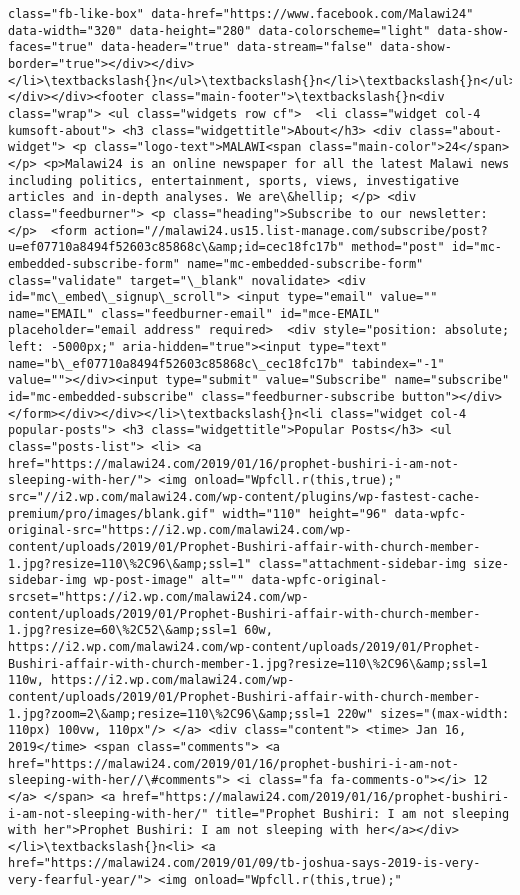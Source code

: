 \documentclass[11pt]{article}
\begin{document}
\begin{Verbatim}[commandchars=\\\{\}]
class="fb-like-box" data-href="https://www.facebook.com/Malawi24" data-width="320" data-height="280" data-colorscheme="light" data-show-faces="true" data-header="true" data-stream="false" data-show-border="true"></div></div></li>\textbackslash{}n</ul>\textbackslash{}n</li>\textbackslash{}n</ul>\textbackslash{}n</aside></div></div><footer class="main-footer">\textbackslash{}n<div class="wrap"> <ul class="widgets row cf">  <li class="widget col-4 kumsoft-about"> <h3 class="widgettitle">About</h3> <div class="about-widget"> <p class="logo-text">MALAWI<span class="main-color">24</span></p> <p>Malawi24 is an online newspaper for all the latest Malawi news including politics, entertainment, sports, views, investigative articles and in-depth analyses. We are\&hellip; </p> <div class="feedburner"> <p class="heading">Subscribe to our newsletter:</p>  <form action="//malawi24.us15.list-manage.com/subscribe/post?u=ef07710a8494f52603c85868c\&amp;id=cec18fc17b" method="post" id="mc-embedded-subscribe-form" name="mc-embedded-subscribe-form" class="validate" target="\_blank" novalidate> <div id="mc\_embed\_signup\_scroll"> <input type="email" value="" name="EMAIL" class="feedburner-email" id="mce-EMAIL" placeholder="email address" required>  <div style="position: absolute; left: -5000px;" aria-hidden="true"><input type="text" name="b\_ef07710a8494f52603c85868c\_cec18fc17b" tabindex="-1" value=""></div><input type="submit" value="Subscribe" name="subscribe" id="mc-embedded-subscribe" class="feedburner-subscribe button"></div></form></div></div></li>\textbackslash{}n<li class="widget col-4 popular-posts"> <h3 class="widgettitle">Popular Posts</h3> <ul class="posts-list"> <li> <a href="https://malawi24.com/2019/01/16/prophet-bushiri-i-am-not-sleeping-with-her/"> <img onload="Wpfcll.r(this,true);" src="//i2.wp.com/malawi24.com/wp-content/plugins/wp-fastest-cache-premium/pro/images/blank.gif" width="110" height="96" data-wpfc-original-src="https://i2.wp.com/malawi24.com/wp-content/uploads/2019/01/Prophet-Bushiri-affair-with-church-member-1.jpg?resize=110\%2C96\&amp;ssl=1" class="attachment-sidebar-img size-sidebar-img wp-post-image" alt="" data-wpfc-original-srcset="https://i2.wp.com/malawi24.com/wp-content/uploads/2019/01/Prophet-Bushiri-affair-with-church-member-1.jpg?resize=60\%2C52\&amp;ssl=1 60w, https://i2.wp.com/malawi24.com/wp-content/uploads/2019/01/Prophet-Bushiri-affair-with-church-member-1.jpg?resize=110\%2C96\&amp;ssl=1 110w, https://i2.wp.com/malawi24.com/wp-content/uploads/2019/01/Prophet-Bushiri-affair-with-church-member-1.jpg?zoom=2\&amp;resize=110\%2C96\&amp;ssl=1 220w" sizes="(max-width: 110px) 100vw, 110px"/> </a> <div class="content"> <time> Jan 16, 2019</time> <span class="comments"> <a href="https://malawi24.com/2019/01/16/prophet-bushiri-i-am-not-sleeping-with-her//\#comments"> <i class="fa fa-comments-o"></i> 12 </a> </span> <a href="https://malawi24.com/2019/01/16/prophet-bushiri-i-am-not-sleeping-with-her/" title="Prophet Bushiri: I am not sleeping with her">Prophet Bushiri: I am not sleeping with her</a></div></li>\textbackslash{}n<li> <a href="https://malawi24.com/2019/01/09/tb-joshua-says-2019-is-very-very-fearful-year/"> <img onload="Wpfcll.r(this,true);" 
\end{Verbatim}
\end{document}

